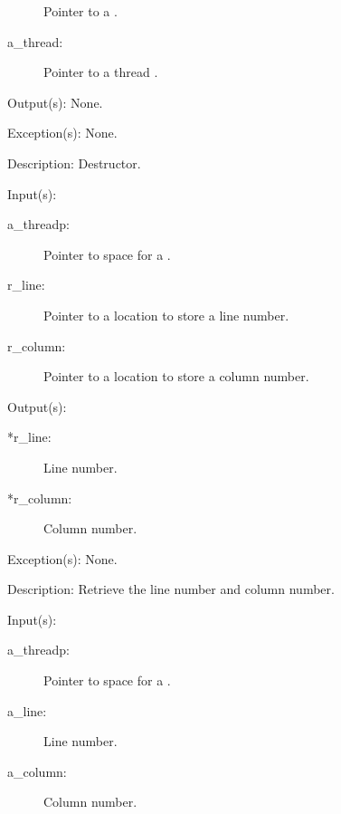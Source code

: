 \begin{capi}
\begin{capilist}
\begin{description}
			Pointer to a .
		\item[a\_thread: ]
			Pointer to a thread .
		\end{description}
	\item[Output(s): ] None.
	\item[Exception(s): ] None.
	\item[Description: ]
		Destructor.
	\end{capilist}
\label{nxo_threadp_position_get}
	\begin{capilist}
	\item[Input(s): ]
		\begin{description}\item[]
		\item[a\_threadp: ]
			Pointer to space for a .
		\item[r\_line: ]
			Pointer to a location to store a line number.
		\item[r\_column: ]
			Pointer to a location to store a column number.
		\end{description}
	\item[Output(s): ]
		\begin{description}\item[]
		\item[*r\_line: ]
			Line number.
		\item[*r\_column: ]
			Column number.
		\end{description}
	\item[Exception(s): ] None.
	\item[Description: ]
		Retrieve the line number and column number.
	\end{capilist}
\label{nxo_threadp_position_set}
	\begin{capilist}
	\item[Input(s): ]
		\begin{description}\item[]
		\item[a\_threadp: ]
			Pointer to space for a \classname{threadp}.
		\item[a\_line: ]
			Line number.
		\item[a\_column: ]
			Column number.

\end{description}
\end{capilist}
\end{capi}
